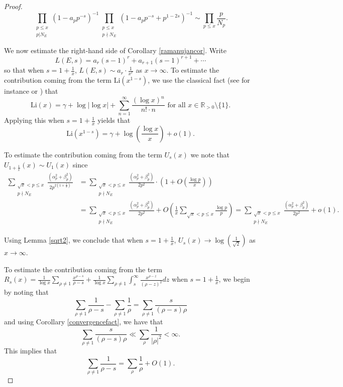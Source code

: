 \documentclass[12pt,reqno]{amsart}
\theoremstyle{definition}
\numberwithin{equation}{section}
\newcommand{\Li}{\mathrm{Li}}
\begin{document}
\begin{proof}
\begin{equation} \label{lhs}
\prod_ {\substack{p \leq x \\ p | N_E}} (1-a_pp^{-s})^{-1} \prod_ {\substack{p \leq x \\ p \nmid N_E}} (1-a_pp^{-s}+p^{1-2s})^{-1} \sim \prod_ {p \leq x} \frac{p}{N_p}. 
\end{equation}



We now estimate the right-hand side of Corollary \ref{ramanujancor}.  Write 
$$
L(E, s)= a_r (s-1)^r+ a_{r+1} (s-1)^{r+1}+ \cdots 
$$
so that when $s=1+\frac{1}{x}$,  $L(E, s) \sim a_r \cdot \frac{1}{x^r}$ as $x \to \infty$. To estimate the contribution coming from the term $\Li(x^{1-s})$, we use the classical fact (see for instance \cite[pp.425]{Finch2003} or  \cite[Equation (2.2.5)]{Hardy1940}) that
$$
\Li(x) = \gamma + \log |\log x| +\sum_{n=1}^{\infty} \frac{ (\log x)^n}{n! \cdot n} \textrm{ for  all } x \in \mathbb  R_{>0} \setminus \{1\} .
$$
Applying this when $s=1+\frac{1}{x}$ yields that 
$$
\Li(x^{1-s}) = \gamma+ \log \left (\frac{\log x}{x} \right )+ o(1). 
$$

To estimate the contribution coming from the term $U_s(x)$ we note that $U_{1+\frac{1}{x}}(x) \sim U_1(x)$ since 
\begin{align*}
\sum_{{\substack{\sqrt x < p \leq x \\ p \nmid  N_E}}} \frac{(\alpha_p^2+\beta_p^2) }{2p^{2(1+\frac{1}{x}) }}&= \sum_{{\substack{\sqrt x < p \leq x \\ p \nmid  N_E}}} \frac{(\alpha_p^2+\beta_p^2) }{2p^{2}} \cdot \left(1+ O\left (\frac{\log p}{x} \right) \right) \\
&= \sum_{{\substack{\sqrt x < p \leq x \\ p \nmid  N_E}}} \frac{(\alpha_p^2+\beta_p^2) }{2p^{2}}+ O\left (\frac{1}{x} \sum_{\sqrt x < p \leq x} \frac{ \log p}{p} \right)= \sum_{{\substack{\sqrt x < p \leq x \\ p \nmid  N_E}}} \frac{(\alpha_p^2+\beta_p^2) }{2p^{2}}+ o(1). 
\end{align*}

Using Lemma \ref{sqrt2}, we conclude that when $s=1+\frac{1}{x}$, $U_s(x) \to \log \left( \frac{1}{\sqrt 2} \right)$ as $x \to \infty$. 

To estimate the contribution coming from the term $R_s(x)= \frac{1}{\log x}\sum \limits_{ \rho \neq 1} \frac{x^{\rho-s}}{ \rho-s}+\frac{1}{\log x} \sum \limits_{\rho \neq 1} \int_{s}^{\infty} \frac{x^{\rho-z}}{(\rho-z)^2}dz$  when $s=1+\frac{1}{x}$,  we begin by noting that 
\begin{equation*}
\sum_{\rho \neq 1} \frac{1}{\rho-s}-\sum_{\rho \neq 1} \frac{1}{\rho} = \sum_{\rho \neq 1} \frac{s}{ (\rho-s) \rho}
\end{equation*}
and using Corollary \ref{convergencefact},  we have that 
\begin{equation*}
\sum_{\rho \neq 1 } \frac{s}{ (\rho-s) \rho} \ll  \sum_{\rho} \frac{1}{|\rho|^2} < \infty. 
\end{equation*}
This implies that 
\begin{equation*}
\sum_{\rho \neq 1} \frac{1}{\rho-s} =\sum_{\rho} \frac{1}{\rho}+O(1). 
\end{equation*}


\end{proof}
\end{document}
